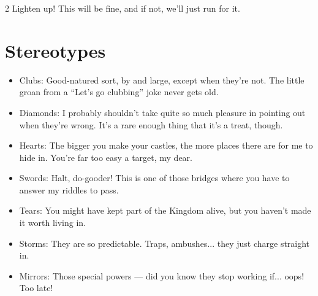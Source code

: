 \begin{multicols}{2}
Lighten up! This will be fine, and if not, we'll just run for it.

\section*{Stereotypes}

\begin{itemize}

\item Clubs: Good-natured sort, by and large, except when they're not. The little groan from a “Let’s go clubbing” joke never gets old.
\item Diamonds: I probably shouldn't take quite so much pleasure in pointing out when they’re wrong. It’s a rare enough thing that it’s a treat, though.
\item Hearts: The bigger you make your castles, the more places there are for me to hide in. You're far too easy a target, my dear.
\item Swords: Halt, do-gooder! This is one of those bridges where you have to answer my riddles to pass.
\item Tears: You might have kept part of the Kingdom alive, but you haven't made it worth living in. 
\item Storms: They are so predictable. Traps, ambushes... they just charge straight in. 
\item Mirrors: Those special powers — did you know they stop working if... oops! Too late!


\end{itemize}
\end{multicols}
